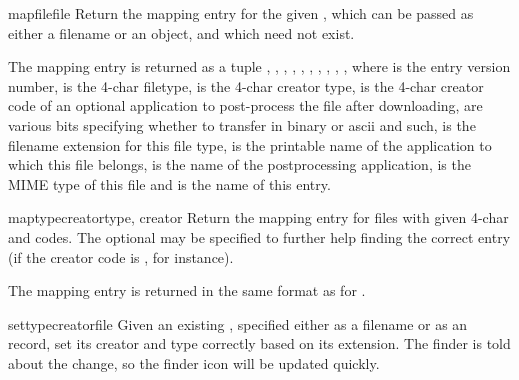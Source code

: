 \begin{funcdesc}{mapfile}{file}
Return the mapping entry for the given , which can be passed
as either a filename or an  object, and which need
not exist.

The mapping entry is returned as a tuple \code{(},
, , , ,
, , , ,
\code{)}, where  is the entry version
number,  is the 4-char filetype,  is the 4-char
creator type,  is the 4-char creator code of an
optional application to post-process the file after downloading,
 are various bits specifying whether to transfer in binary
or ascii and such,  is the filename extension for this
file type,  is the printable name of the application to
which this file belongs,  is the name of the
postprocessing application,  is the MIME type of this
file and  is the name of this entry.
\end{funcdesc}

\begin{funcdesc}{maptypecreator}{type, creator}
Return the mapping entry for files with given 4-char  and
 codes. The optional  may be specified to
further help finding the correct entry (if the creator code is
, for instance).

The mapping entry is returned in the same format as for .
\end{funcdesc}

\begin{funcdesc}{settypecreator}{file}
Given an existing , specified either as a filename or as an
 record, set its creator and type correctly based
on its extension.  The finder is told about the change, so the finder
icon will be updated quickly.
\end{funcdesc}
